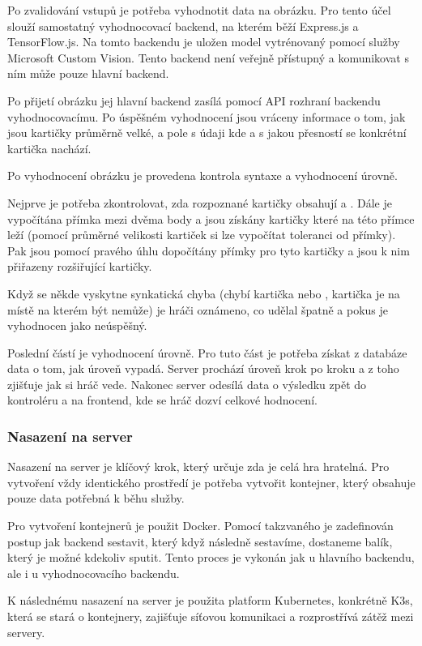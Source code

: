 Po zvalidování vstupů je potřeba vyhodnotit data na obrázku. Pro tento účel slouží samostatný vyhodnocovací backend, na kterém běží Express.js a TensorFlow.js. Na tomto backendu je uložen model vytrénovaný pomocí služby Microsoft Custom Vision. Tento backend není veřejně přístupný a komunikovat s ním může pouze hlavní backend.\par
Po přijetí obrázku jej hlavní backend zasílá pomocí API rozhraní backendu vyhodnocovacímu. Po úspěšném vyhodnocení jsou vráceny informace o tom, jak jsou kartičky průměrně velké, a pole s údaji kde a s jakou přesností se konkrétní kartička nachází.

Po vyhodnocení obrázku je provedena kontrola syntaxe a vyhodnocení úrovně.\par
Nejprve je potřeba zkontrolovat, zda rozpoznané kartičky obsahují  a . Dále je vypočítána přímka mezi dvěma body a jsou získány kartičky které na této přímce leží (pomocí průměrné velikosti kartiček si lze vypočítat toleranci od přímky). Pak jsou pomocí pravého úhlu dopočítány přímky pro tyto kartičky a jsou k nim přiřazeny rozšiřující kartičky.\par
Když se někde vyskytne synkatická chyba (chybí kartička  nebo , kartička je na místě na kterém být nemůže) je hráči oznámeno, co udělal špatně a pokus je vyhodnocen jako neúspěšný.\par
Poslední částí je vyhodnocení úrovně. Pro tuto část je potřeba získat z databáze data o tom, jak úroveň vypadá. Server prochází úroveň krok po kroku a z toho zjišťuje jak si hráč vede. Nakonec server odesílá data o výsledku zpět do kontroléru a na frontend, kde se hráč dozví celkové hodnocení.

\subsubsection{Nasazení na server}
Nasazení na server je klíčový krok, který určuje zda je celá hra hratelná.
Pro vytvoření vždy identického prostředí je potřeba vytvořit kontejner, který obsahuje pouze data potřebná k běhu služby.\par
Pro vytvoření kontejnerů je použit Docker. Pomocí takzvaného  je zadefinován postup jak backend sestavit, který když následně sestavíme, dostaneme balík, který je možné kdekoliv sputit. Tento proces je vykonán jak u hlavního backendu, ale i u vyhodnocovacího backendu.\par
K následnému nasazení na server je použita platform Kubernetes, konkrétně K3s, která se stará o kontejnery, zajišťuje síťovou komunikaci a rozprostřívá zátěž mezi servery.
